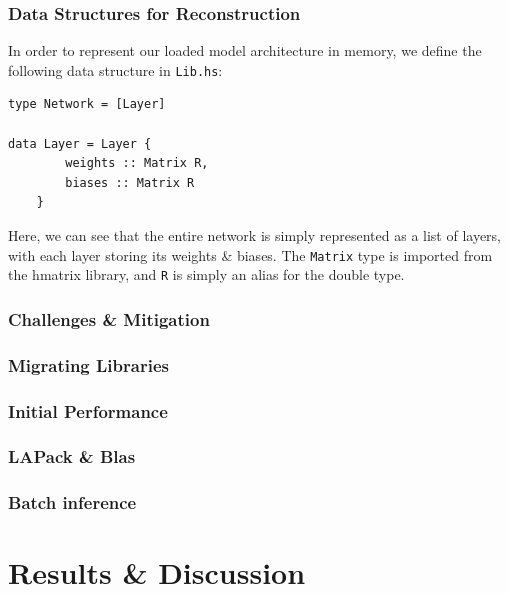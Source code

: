 \documentclass[12pt, titlepage]{article}
\begin{document}
\subsubsection{Data Structures for Reconstruction}
In order to represent our loaded model architecture in memory, we define the following data structure in \verb|Lib.hs|:
\begin{lstlisting}
type Network = [Layer]

data Layer = Layer {
		weights :: Matrix R,
		biases :: Matrix R
	}
\end{lstlisting}
Here, we can see that the entire network is simply represented as a list of layers, with each layer storing its weights \& biases. The \verb|Matrix| type is imported from the hmatrix library, and \verb|R| is simply an alias for the double type.

\subsubsection{Challenges \& Mitigation}
\subsubsection{Migrating Libraries}
\subsubsection{Initial Performance}
\subsubsection{LAPack \& Blas}
\subsubsection{Batch inference}


\section{Results \& Discussion}
\end{document}
